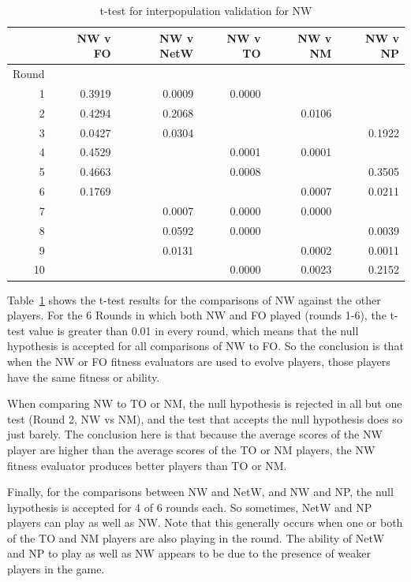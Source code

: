 \begin{table}[htbp]
  \centering
  \caption{t-test for interpopulation validation for NW}
    \begin{tabular}{rrrrrr}
    \toprule
          & NW v FO & NW v NetW & NW v TO & NW v NM & NW v NP \\
    \midrule
    Round &         &           &         &         &  \\
    1     & 0.3919  & 0.0009    & 0.0000  &         &  \\
    2     & 0.4294  & 0.2068    &         & 0.0106  &  \\
    3     & 0.0427  & 0.0304    &         &         & 0.1922 \\
    4     & 0.4529  &           & 0.0001  & 0.0001  &  \\
    5     & 0.4663  &           & 0.0008  &         & 0.3505 \\
    6     & 0.1769  &           &         & 0.0007  & 0.0211 \\
    7     &         & 0.0007    & 0.0000  & 0.0000  &  \\
    8     &         & 0.0592    & 0.0000  &         & 0.0039 \\
    9     &         & 0.0131    &         & 0.0002  & 0.0011 \\
    10    &         &           & 0.0000  & 0.0023  & 0.2152 \\
    \bottomrule
    \end{tabular}%
  \label{tab:interpop_ttest1}%
\end{table}%

Table~\ref{tab:interpop_ttest1} shows the t-test results for the comparisons of
NW against the other players. For the 6 Rounds in which both NW and FO played
(rounds 1-6), the t-test value is greater than 0.01 in every round, which means
that the null hypothesis is accepted for all comparisons of NW to FO. So the
conclusion is that when the NW or FO fitness evaluators are used to evolve
players, those players have the same fitness or ability.

When comparing NW to TO or NM, the null hypothesis is rejected in all but one
test (Round 2, NW vs NM), and the test that accepts the null hypothesis does so
just barely. The conclusion here is that because the average scores of the NW
player are higher than the average scores of the TO or NM players, the NW
fitness evaluator produces better players than TO or NM.

Finally, for the comparisons between NW and NetW, and NW and NP, the null
hypothesis is accepted for 4 of 6 rounds each. So sometimes, NetW and NP players
can play as well as NW. Note that this generally occurs when one or both of the
TO and NM players are also playing in the round. The ability of NetW and NP to
play as well as NW appears to be due to the presence of weaker players in the
game.


